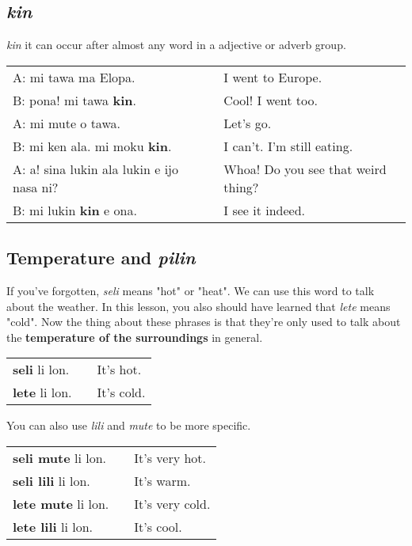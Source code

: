 \subsection*{\textit{kin}}
%
\textit{kin} it can occur after almost any word in a adjective or adverb group. 

\begin{supertabular}{p{5,5cm}|ll}
A: mi tawa ma Elopa. && I went to Europe. \\
B: pona! mi tawa \textbf{kin}. && Cool! I went too. \\
A: mi mute o tawa. && Let's go. \\
B: mi ken ala. mi moku \textbf{kin}. && I can't. I'm still eating. \\
A: a! sina lukin ala lukin e ijo nasa ni? && Whoa! Do you see that weird thing? \\
B: mi lukin \textbf{kin} e ona. && I see it indeed. \\
\end{supertabular} 
%
\newpage
{}
\subsection*{Temperature and \textit{pilin}}
%
If you've forgotten, \textit{seli} means "hot" or "heat". 
We can use this word to talk about the weather. 
In this lesson, you also should have learned that \textit{lete} means "cold". 
Now the thing about these phrases is that they're only used to talk about the \textbf{temperature of the surroundings} in general. 

\begin{supertabular}{p{5,5cm}|ll}
\textbf{seli} li lon. && It's hot. \\
\textbf{lete} li lon. && It's cold. \\
\end{supertabular} 

You can also use \textit{lili} and \textit{mute} to be more specific. 
 
\begin{supertabular}{p{5,5cm}|ll}
\textbf{seli mute} li lon. && It's very hot. \\
\textbf{seli lili} li lon. && It's warm. \\
\textbf{lete mute} li lon. && It's very cold. \\
\textbf{lete lili} li lon. && It's cool. \\
\end{supertabular} 

